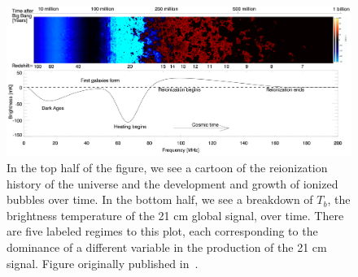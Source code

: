 \begin{figure}
    \begin{center}
    \includegraphics[width=\linewidth]{global_signal.png}
    \end{center}
    \caption{
        In the top half of the figure, we see a cartoon of the reionization 
        history of the universe and the development and growth of ionized 
        bubbles over time. In the bottom half, we see a breakdown of $T_b$, the 
        brightness temperature of the 21 cm global signal, over time. There are 
        five labeled regimes to this plot, each corresponding to the dominance 
        of a different variable in the production of the 21 cm signal. Figure 
        originally published in~\citealp{pritchard-loeb2012}.
    }
    \label{fig:global-signal}
\end{figure}


